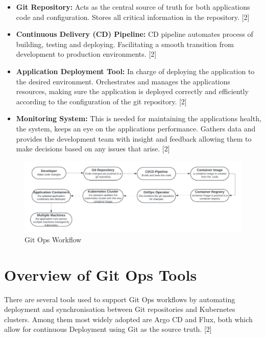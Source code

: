 \documentclass[conference]{IEEEtran}
\begin{document}
\begin{itemize}
    \item \textbf{Git Repository:} Acts as the central source of truth for both applications code and configuration. Stores all critical information in the repository. [2]
    
    \item \textbf{Continuous Delivery (CD) Pipeline:} CD pipeline automates process of building, testing and deploying. Facilitating a smooth transition from development to production environments. [2]
    
    \item \textbf{Application Deployment Tool:} In charge of deploying the application to the desired environment. Orchestrates and manages the applications resources, making sure the application is deployed correctly and efficiently according to the configuration of the git repository. [2]

    \item \textbf{Monitoring System:} This is needed for maintaining the applications health, the system, keeps an eye on the applications performance. Gathers data and provides the development team with insight and feedback allowing them to make decisions based on any issues that arise. [2]
\end{itemize}

\begin{figure}[htbp]
    \centering
    \includegraphics[width=1\linewidth]{Git Ops WorkFlow.png}
    \caption{Git Ops Workflow}
    \label{fig:gitops-workflow}
\end{figure}

\section{Overview of Git Ops Tools}
There are several tools used to support Git Ops workflows by automating deployment and synchronisation between Git repositories and Kubernetes clusters. Among them most widely adopted are Argo CD and Flux, both which allow for continuous Deployment using Git as the source truth. [2]
\end{document}
